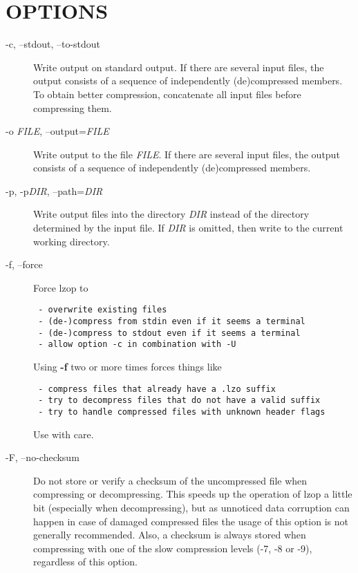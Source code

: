 \section{OPTIONS\label{OPTIONS}}
\begin{description}

\item[-c, --stdout, --to-stdout] \mbox{}

Write output on standard output. If there are several
input files, the output consists of a sequence
of independently (de)compressed members. To obtain
better compression, concatenate all input files
before compressing them.


\item[-o \textit{FILE}, --output=\textit{FILE}] \mbox{}

Write output to the file \textit{FILE}. If there are several
input files, the output consists of a sequence
of independently (de)compressed members.


\item[-p, -p\textit{DIR}, --path=\textit{DIR}] \mbox{}

Write output files into the directory \textit{DIR} instead
of the directory determined by the input file. If
\textit{DIR} is omitted, then write to the current working
directory.


\item[-f, --force] \mbox{}

Force lzop to

\begin{verbatim}
 - overwrite existing files
 - (de-)compress from stdin even if it seems a terminal
 - (de-)compress to stdout even if it seems a terminal
 - allow option -c in combination with -U
\end{verbatim}


Using \textbf{-f} two or more times forces things like

\begin{verbatim}
 - compress files that already have a .lzo suffix
 - try to decompress files that do not have a valid suffix
 - try to handle compressed files with unknown header flags
\end{verbatim}


Use with care.


\item[-F, --no-checksum] \mbox{}

Do not store or verify a checksum of the uncompressed
file when compressing or decompressing.
This speeds up the operation of lzop a little bit (especially
when decompressing), but as unnoticed data corruption can happen
in case of damaged compressed files the usage of this option
is not generally recommended.
Also, a checksum is always stored when
compressing with one of the slow compression levels (-7, -8 or -9),
regardless of this option.



\end{description}
